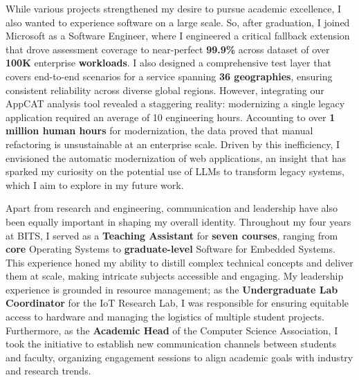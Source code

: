 \documentclass[12pt]{article}
\begin{document}
\vspace{0.5em}
While various projects strengthened my desire to pursue academic excellence, I also wanted to experience software on a large scale. So, after graduation, I joined Microsoft as a Software Engineer, where I engineered a critical fallback extension that drove assessment coverage to near-perfect \textbf{99.9\%} across dataset of over \textbf{100K }enterprise\textbf{ workloads}. I also designed a comprehensive test layer that covers end-to-end scenarios for a service spanning \textbf{36 geographies}, ensuring consistent reliability across diverse global regions. However, integrating our AppCAT analysis tool revealed a staggering reality: modernizing a single legacy application required an average of 10 engineering hours. Accounting to over \textbf{1 million human hours} for modernization, the data proved that manual refactoring is unsustainable at an enterprise scale. Driven by this inefficiency, I envisioned the automatic modernization of web applications, an insight that has sparked my curiosity on the potential use of LLMs to transform legacy systems, which I aim to explore in my future work.

\vspace{0.5em}
Apart from research and engineering, communication and leadership have also been equally important in shaping my overall identity. Throughout my four years at BITS, I served as a \textbf{Teaching Assistant }for\textbf{ seven courses}, ranging from \textbf{core} Operating Systems to \textbf{graduate-level} Software for Embedded Systems. This experience honed my ability to distill complex technical concepts and deliver them at scale, making intricate subjects accessible and engaging. My leadership experience is grounded in resource management; as the \textbf{Undergraduate Lab Coordinator} for the IoT Research Lab, I was responsible for ensuring equitable access to hardware and managing the logistics of multiple student projects. Furthermore, as the \textbf{Academic Head} of the Computer Science Association, I took the initiative to establish new communication channels between students and faculty, organizing engagement sessions to align academic goals with industry and research trends.
\end{document}
